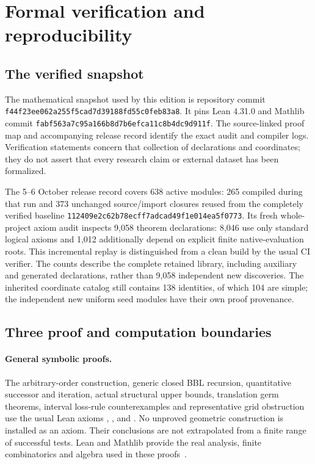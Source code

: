 \section{Formal verification and reproducibility}\label{sec:formalization}

\subsection{The verified snapshot}

The mathematical snapshot used by this edition is repository commit
\nolinkurl{f44f23ee062a255f5cad7d39188fd55c0feb83a8}. It pins Lean 4.31.0 and Mathlib commit
\nolinkurl{fabf563a7c95a166b8d7b6efca11c8b4dc9d911f}. The source-linked
proof map and accompanying release record identify the exact audit and
compiler logs. Verification statements concern that collection of
declarations and coordinates; they do not assert that every research
claim or external dataset has been formalized.

The 5--6 October release record covers 638 active modules: 265 compiled
during that run and 373 unchanged source/import closures reused from
the completely verified baseline \nolinkurl{112409e2c62b78ecff7adcad49f1e014ea5f0773}.
Its fresh whole-project axiom audit inspects 9,058 theorem declarations:
8,046 use only standard logical axioms and 1,012 additionally depend
on explicit finite native-evaluation roots. This incremental replay is
distinguished from a clean build by the usual CI verifier. The counts
describe the complete retained library, including auxiliary and generated
declarations, rather than 9,058 independent new discoveries. The inherited
coordinate catalog still contains 138 identities, of which 104 are simple;
the independent new uniform seed modules have their own proof provenance.

\subsection{Three proof and computation boundaries}

\paragraph{General symbolic proofs.}
The arbitrary-order construction, generic closed BBL recursion,
quantitative successor and iteration, actual structural upper bounds,
translation germ theorems, interval loss-rule counterexamples and
representative grid obstruction use the usual Lean axioms
, , and .
No unproved geometric construction is installed as an axiom. Their
conclusions are not extrapolated from a finite range of successful
tests. Lean and Mathlib provide the real analysis, finite combinatorics
and algebra used in these proofs~\cite{lean4,mathlib}.

